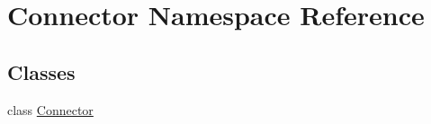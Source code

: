 \hypertarget{namespace_connector}{}\section{Connector Namespace Reference}
\label{namespace_connector}
\subsection*{Classes}
\begin{DoxyCompactItemize}
\item 
class \hyperlink{class_connector_1_1_connector}{Connector}
\end{DoxyCompactItemize}
